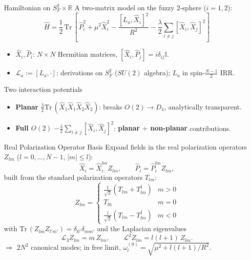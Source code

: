 \documentclass{beamer}
\newcommand{\new}[1]{{\color{metuaccent}\textbf{#1}}}
\newcommand{\Tr}{\mathrm{Tr}\,}
\begin{document}
\begin{frame}{Hamiltonian on $S_F^2 \times \mathbb{R}$}
  A two-matrix model on the fuzzy 2-sphere ($i=1,2$):
  \begin{equation*}
    \hat{H} = \frac{1}{2}\,\Tr\!\left[\, \hat{P}_i^2 + \mu^2 \hat{X}_i^2 - \frac{[L_a,\hat{X}_i]^2}{R^2} - \frac{\lambda}{2}\sum_{i\neq j}[\hat{X}_i,\hat{X}_j]^2 \right]
  \end{equation*}
  \begin{itemize}
    \item $\hat{X}_i,\hat{P}_i$: $N\times N$ Hermitian matrices, $[\hat X_i,\hat P_j]=i\delta_{ij}\mathbb{I}$.
    \item $\mathcal{L}_a:=[L_a,\cdot]$: derivations on $S_F^2$ ($SU(2)$ algebra); $L_a$ in spin-$\tfrac{N-1}{2}$ IRR.
  \end{itemize}
  \begin{block}{Two interaction potentials}
    \begin{itemize}
      \item \textbf{Planar} $\tfrac{\lambda}{2}\Tr(\hat X_1\hat X_1\hat X_2\hat X_2)$: breaks $O(2)\to D_4$, analytically transparent.
      \item \new{Full $O(2)$} $-\tfrac{\lambda}{2}\sum_{i\neq j}[\hat X_i,\hat X_j]^2$: \new{planar $+$ non-planar} contributions.
    \end{itemize}
  \end{block}
\end{frame}

\begin{frame}{Real Polarization Operator Basis}
  Expand fields in the real polarization operators $Z_{lm}$ ($l=0,\dots,N-1$, $|m|\le l$):
  \begin{equation*}
    \hat{X}_i = \hat{X}_i^{lm} Z_{lm}, \qquad \hat{P}_i = \hat{P}_i^{lm} Z_{lm},
  \end{equation*}
  built from the standard polarization operators $T_{lm}$:
  \begin{equation*}
    Z_{lm} =
    \begin{cases}
      \tfrac{1}{\sqrt{2}}(T_{lm}+T_{lm}^\dagger) & m>0 \\
      T_{l0} & m=0 \\
      \tfrac{i}{\sqrt{2}}(T_{lm}-T_{lm}^\dagger) & m<0
    \end{cases}
  \end{equation*}
  with $\Tr(Z_{lm}Z_{l'm'})=\delta_{ll'}\delta_{mm'}$ and the Laplacian eigenvalues
  \begin{equation*}
    \mathcal{L}_3 Z_{lm}=m\,Z_{lm}, \qquad \mathcal{L}^2 Z_{lm}=l(l+1)\,Z_{lm}.
  \end{equation*}
  $\Rightarrow$ $2N^2$ canonical modes; in free limit, $\omega_l^{(0)}=\sqrt{\mu^2+l(l+1)/R^2}$.
\end{frame}
\end{document}
